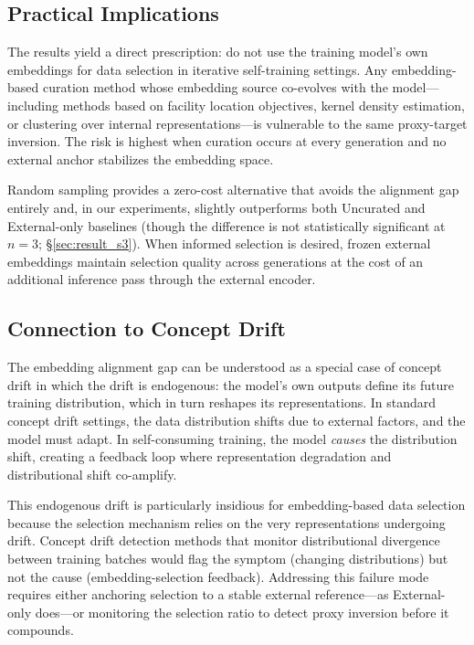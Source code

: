 \subsection{Practical Implications}

The results yield a direct prescription: do not use the training model's own embeddings for data selection in iterative self-training settings. Any embedding-based curation method whose embedding source co-evolves with the model---including methods based on facility location objectives, kernel density estimation, or clustering over internal representations---is vulnerable to the same proxy-target inversion. The risk is highest when curation occurs at every generation and no external anchor stabilizes the embedding space.

Random sampling provides a zero-cost alternative that avoids the alignment gap entirely and, in our experiments, slightly outperforms both Uncurated and External-only baselines (though the difference is not statistically significant at $n{=}3$; \S\ref{sec:result_s3}). When informed selection is desired, frozen external embeddings maintain selection quality across generations at the cost of an additional inference pass through the external encoder.

\subsection{Connection to Concept Drift}

The embedding alignment gap can be understood as a special case of concept drift \citep{lu2019learning, gama2014survey} in which the drift is endogenous: the model's own outputs define its future training distribution, which in turn reshapes its representations. In standard concept drift settings, the data distribution shifts due to external factors, and the model must adapt. In self-consuming training, the model \emph{causes} the distribution shift, creating a feedback loop where representation degradation and distributional shift co-amplify.

This endogenous drift is particularly insidious for embedding-based data selection because the selection mechanism relies on the very representations undergoing drift. Concept drift detection methods that monitor distributional divergence between training batches would flag the symptom (changing distributions) but not the cause (embedding-selection feedback). Addressing this failure mode requires either anchoring selection to a stable external reference---as External-only does---or monitoring the selection ratio to detect proxy inversion before it compounds.

